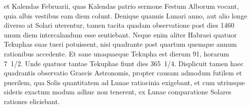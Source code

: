 et Kalendas Februarii, quas Kalendas patrio sermone Festum Alborum
vocant, quia albis vestibus eam diem colunt.
Denique quanuis
Lunari anno, aut alio longe diverso at Solari uterentur, tamen tacita
quadam observatione post dies 1460 unum diem intercalandum esse
sentiebant.
Neque enim aliter Habraei quatuor Tekuphas suas tueri
potuissent, nisi quadrante post quartum quemque annum rationibus accedente.
Et sane unaquaeque Tekupha est dierum 91, horarum 7~1/2.
Unde
quatuor tantae Tekuphae fiunt dies 365~1/4.
Displicuit tamen haec quadrantis
observatio Graecis Astronomis, propter causam admodum futilem
et puerilem, qua Solis quantitatem ad Lunae ratiocinia exigebant,
et cum utriusque sideris exactum modum adhuc non tenerent,
ex Lunae comparatione Solares rationes eliciebant.

